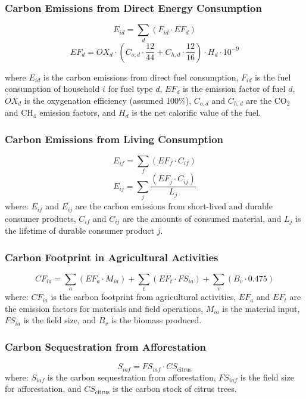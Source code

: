 \documentclass[12pt,a4paper]{article}
\begin{document}
\subsubsection*{Carbon Emissions from Direct Energy Consumption}
\begin{equation}
E_{id} = \sum_d (F_{id} \cdot EF_d)
\end{equation}
\begin{equation}
EF_d = OX_d \cdot \left(C_{o,d} \cdot \frac{12}{44} + C_{h,d} \cdot \frac{12}{16}\right) \cdot H_d \cdot 10^{-9}
\end{equation}

where $E_{id}$ is the carbon emissions from direct fuel consumption, $F_{id}$ is the fuel consumption of household $i$ for fuel type $d$, $EF_d$ is the emission factor of fuel $d$, $OX_d$ is the oxygenation efficiency (assumed 100\%), $C_{o,d}$ and $C_{h,d}$ are the CO$_2$ and CH$_4$ emission factors, and $H_d$ is the net calorific value of the fuel.


\subsubsection*{Carbon Emissions from Living Consumption}
\begin{equation}
E_{if} = \sum_f (EF_f \cdot C_{if})
\end{equation}
\begin{equation}
E_{ij} = \sum_j \frac{(EF_j \cdot C_{ij})}{L_j}
\end{equation}
where: $E_{if}$ and $E_{ij}$ are the carbon emissions from short-lived and durable consumer products, $C_{if}$ and $C_{ij}$ are the amounts of consumed material, and $L_j$ is the lifetime of durable consumer product $j$.


\subsubsection*{Carbon Footprint in Agricultural Activities}
\begin{equation}
CF_{ia} = \sum_a (EF_a \cdot M_{ia}) + \sum_t (EF_t \cdot FS_{ia}) + \sum_v (B_v \cdot 0.475)
\end{equation}
where: $CF_{ia}$ is the carbon footprint from agricultural activities, $EF_a$ and $EF_t$ are the emission factors for materials and field operations, $M_{ia}$ is the material input, $FS_{ia}$ is the field size, and $B_v$ is the biomass produced.


\subsubsection*{Carbon Sequestration from Afforestation}
\begin{equation}
S_{iaf} = FS_{iaf} \cdot CS_{\text{citrus}}
\end{equation}
where: $S_{iaf}$ is the carbon sequestration from afforestation, $FS_{iaf}$ is the field size for afforestation, and $CS_{\text{citrus}}$ is the carbon stock of citrus trees.
\end{document}
